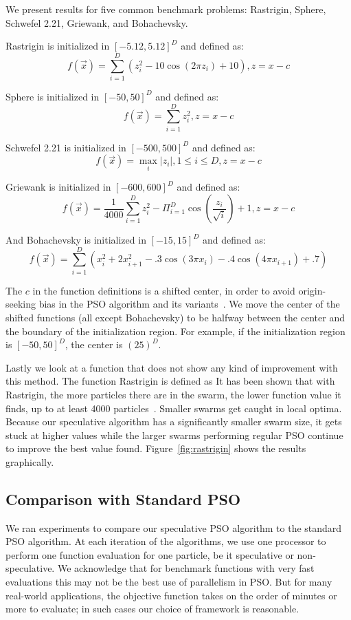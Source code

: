 \documentclass[journal,letterpaper]{IEEEtran}
\newcommand{\fig}[1]{Figure~\ref{fig:#1}}
\begin{document}
We present results for five common benchmark problems: Rastrigin, Sphere,
Schwefel 2.21, Griewank, and Bohachevsky.  

Rastrigin is initialized in $[-5.12,5.12]^D$ and defined as:
\[f(\Vec{x}) = \sum_{i=1}^D\left(z_i^2 - 10\cos\left(2\pi z_i\right) +
10\right), z=x-c\]

Sphere is initialized in $[-50,50]^D$ and defined as:
\[f(\Vec{x}) = \sum_{i=1}^D z_i^2, z=x-c\]

Schwefel 2.21 is initialized in $[-500,500]^D$ and defined as:
\[f(\Vec{x}) = \max_i{|z_i|, 1 \leq i \leq D}, z=x-c\]

Griewank is initialized in $[-600,600]^D$ and defined as:
\[f(\Vec{x}) = \frac{1}{4000}\sum_{i=1}^D z_i^2 - \Pi_{i=1}^D
\cos\left(\frac{z_i}{\sqrt{i}} \right) + 1, z=x-c\]

And Bohachevsky is initialized in $[-15,15]^D$ and defined as:
\[f(\Vec{x}) = \sum_{i=1}^D(x_i^2+2x_{i+1}^2-.3\cos(3\pi x_i)-.4\cos(4\pi
x_{i+1})+.7)\]


The $c$ in the function definitions is a shifted center, in order to avoid
origin-seeking bias in the PSO algorithm and its
variants~\cite{monson-2005-origin-seeking-bias}.  We move the center of the
shifted functions (all except Bohachevsky) to be halfway between the center and
the boundary of the initialization region.  For example, if the initialization
region is $[-50,50]^D$, the center is $(25)^D$.

Lastly we look at a function that does not show any kind of improvement with
this method.  The function Rastrigin is defined as 
It has been shown that
with Rastrigin, the more particles there are in the swarm, the lower function
value it finds, up to at least 4000
particles~\cite{mcnabb-2009-large-particle-swarms}.  Smaller swarms get caught
in local optima.  Because our speculative algorithm has a significantly smaller
swarm size, it gets stuck at higher values while the larger swarms performing
regular PSO continue to improve the best value found.  \fig{rastrigin} shows
the results graphically.
\subsection{Comparison with Standard PSO}

We ran experiments to compare our speculative PSO algorithm to the standard PSO
algorithm.  At each iteration of the algorithms, we use one processor to
perform one function evaluation for one particle, be it speculative or
non-speculative.  We acknowledge that for benchmark functions with very fast
evaluations this may not be the best use of parallelism in PSO.  But for many
real-world applications, the objective function takes on the order of minutes
or more to evaluate; in such cases our choice of framework is reasonable.
\end{document}

